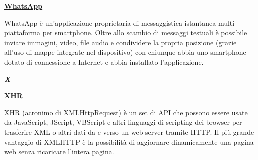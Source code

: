 \bigskip
\begin{addmargin}[0em]{0em}
	\textbf{\underline{WhatsApp}}
\end{addmargin} 

\medskip
\begin{addmargin}[5em]{1em}
WhatsApp è un'applicazione proprietaria di messaggistica istantanea multi-piattaforma per smartphone. Oltre allo scambio di messaggi testuali è possibile inviare immagini, video, file audio e condividere la propria posizione (grazie all'uso di mappe integrate nel dispositivo) con chiunque abbia uno smartphone dotato di connessione a Internet e abbia installato l'applicazione.
\end{addmargin}

\newpage

\cleardoublepage
{}
{}
\noindent\hrulefill\hspace{4mm}\textbf{\textsl{\Huge{X}}}\hspace{4mm}\hrulefill
\vspace*{2\bigskipamount}

\begin{addmargin}[0em]{0em}
	\textbf{\underline{XHR}}
\end{addmargin} 

\medskip
\begin{addmargin}[5em]{1em}
 XHR (acronimo di XMLHttpRequest) è un set di API che possono essere usate da JavaScript, JScript, VBScript e altri linguaggi di scripting dei browser per trasferire XML o altri dati da e verso un web server tramite HTTP. Il più grande vantaggio di XMLHTTP è la possibilità di aggiornare dinamicamente una pagina web senza ricaricare l'intera pagina.
\end{addmargin}

		
